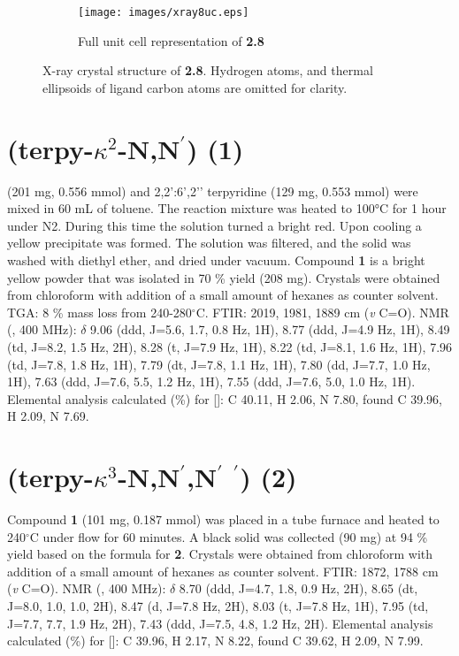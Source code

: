 \begin{figure}[!ht]
\begin{subfigure}[b]{0.49\textwidth}
 \end{subfigure}
 \begin{subfigure}[b]{\textwidth}
  \centering
  \texttt{[image: images/xray8uc.eps]}
  \caption{Full unit cell representation of \textbf{2.8}}
 \end{subfigure}
\caption[X-ray crystal structure of \textbf{2.8}]{X-ray crystal structure of \textbf{2.8}. Hydrogen atoms, and thermal ellipsoids of ligand carbon atoms are omitted for clarity.}
\label{fig.xray28}
\end{figure}

\section{(terpy-$\kappa^2$-N,N$^\prime$) (1)}\label{sec.c1}
 (201 mg,  0.556 mmol) and 2,2’:6’,2’’ terpyridine (129 mg, 0.553 mmol) were mixed in 60 mL of toluene. The reaction mixture was heated to 100°C for 1 hour under N2. During this time the solution turned a bright red. Upon cooling a yellow precipitate was formed. The solution was filtered, and the solid was washed with diethyl ether, and dried under vacuum. Compound \textbf{1} is a bright yellow powder that was isolated in 70 \% yield (208 mg). Crystals were obtained from chloroform with addition of a small amount of hexanes as counter solvent. TGA: 8 \% mass loss from 240-280$^\circ$C.  FTIR: 2019, 1981, 1889 cm (\textit{v} C=O).  NMR (, 400 MHz): $\delta$ 9.06 (ddd, J=5.6, 1.7, 0.8 Hz, 1H), 8.77 (ddd, J=4.9 Hz, 1H), 8.49 (td, J=8.2, 1.5 Hz, 2H), 8.28 (t, J=7.9 Hz, 1H), 8.22 (td, J=8.1, 1.6 Hz, 1H), 7.96 (td, J=7.8, 1.8 Hz, 1H), 7.79 (dt, J=7.8, 1.1 Hz, 1H), 7.80 (dd, J=7.7, 1.0 Hz, 1H), 7.63 (ddd, J=7.6, 5.5, 1.2 Hz, 1H), 7.55 (ddd, J=7.6, 5.0, 1.0 Hz, 1H). Elemental analysis calculated (\%) for []: C 40.11, H 2.06, N 7.80, found C 39.96, H 2.09, N 7.69.

\section{(terpy-$\kappa^3$-N,N$^\prime$,N$^\prime$ $^\prime$) (2)}\label{sec.c2}
Compound \textbf{1} (101 mg, 0.187 mmol) was placed in a tube furnace and heated to 240$^\circ$C under  flow for 60 minutes. A black solid was collected (90 mg) at 94 \% yield based on the formula for \textbf{2}. Crystals were obtained from chloroform with addition of a small amount of hexanes as counter solvent. FTIR: 1872, 1788 cm (\textit{v} C=O).  NMR (, 400 MHz): $\delta$ 8.70 (ddd, J=4.7, 1.8, 0.9 Hz, 2H), 8.65 (dt, J=8.0, 1.0, 1.0, 2H), 8.47 (d, J=7.8 Hz, 2H), 8.03 (t, J=7.8 Hz, 1H), 7.95 (td, J=7.7, 7.7, 1.9 Hz, 2H), 7.43 (ddd, J=7.5, 4.8, 1.2 Hz, 2H). Elemental analysis calculated (\%) for []: C 39.96, H 2.17, N 8.22, found C 39.62, H 2.09, N 7.99.

